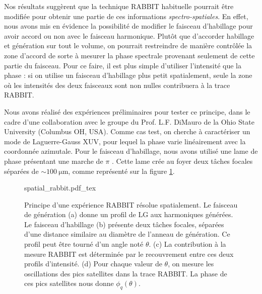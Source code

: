 Nos résultats suggèrent que la technique RABBIT habituelle pourrait être modifiée pour obtenir une partie de ces informations \textit{spectro-spatiales}. En effet, nous avons mis en évidence la possibilité de modifier le faisceau d'habillage pour avoir accord ou non avec le faisceau harmonique. Plutôt que d'accorder habillage et génération sur tout le volume, on pourrait restreindre de manière contrôlée la zone d'accord de sorte à mesurer la phase spectrale provenant seulement de cette partie du faisceau. Pour ce faire, il est plus simple d'utiliser l'intensité que la phase : si on utilise un faisceau d'habillage plus petit spatialement, seule la zone où les intensités des deux faisceaux sont non nulles contribuera à la trace RABBIT. 

Nous avons réalisé des expériences préliminaires pour tester ce principe, dans le cadre d'une collaboration avec le groupe du Prof. L.F. DiMauro de la Ohio State University (Columbus OH, USA). Comme cas test, on cherche à caractériser un mode de Laguerre-Gauss XUV, pour lequel la phase varie linéairement avec la coordonnée azimutale. Pour le faisceau d'habillage, nous avons utilisé une lame de phase présentant une marche de $\pi$ . Cette lame crée au foyer deux tâches focales séparées de $\sim \SI{100}{\micro\metre}$, comme représenté sur la figure \ref{fig:spatialrabbit}. 

\begin{figure}[!ht]
\centering
\def\svgwidth{\columnwidth}
{spatial_rabbit.pdf_tex}
\caption{Principe d'une expérience RABBIT résolue spatialement. Le faisceau de génération (a) donne un profil de LG aux harmoniques générées. Le faisceau d'habillage (b) présente deux tâches focales, séparées d'une distance similaire au diamètre de l'anneau de génération. Ce profil peut être tourné d'un angle noté $\theta$. (c) La contribution à la mesure RABBIT est déterminée par le recouvrement entre ces deux profils d'intensité. (d) Pour chaque valeur de $\theta$, on mesure les oscillations des pics satellites dans la trace RABBIT. La phase de ces pics satellites nous donne $\phi_q(\theta)$.}
\label{fig:spatialrabbit}
\end{figure}

